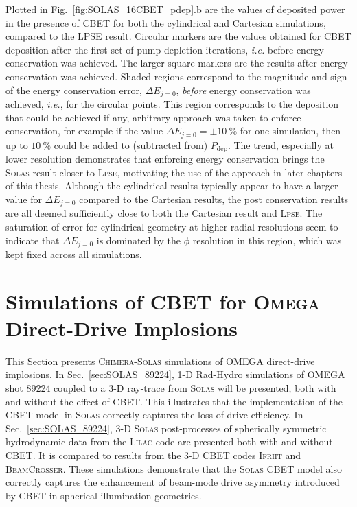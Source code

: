 Plotted in Fig.~\ref{fig:SOLAS_16CBET_pdep}.b are the values of deposited power in the presence of \ac{CBET} for both the cylindrical and Cartesian simulations, compared to the \textsc{LPSE} result.
Circular markers are the values obtained for \ac{CBET} deposition after the first set of pump-depletion iterations, \textit{i.e.} before energy conservation was achieved.
The larger square markers are the results after energy conservation was achieved.
Shaded regions correspond to the magnitude and sign of the energy conservation error, $\Delta E_{j=0}$, \textit{before} energy conservation was achieved, \textit{i.e.}, for the circular points.
This region corresponds to the deposition that could be achieved if any, arbitrary approach was taken to enforce conservation, for example if the value $\Delta E_{j=0}=\pm10\ \%$ for one simulation, then up to $10\ \%$ could be added to (subtracted from) $P_{\text{dep}}$.
The trend, especially at lower resolution demonstrates that enforcing energy conservation brings the \textsc{Solas} result closer to \textsc{Lpse}, motivating the use of the approach in later chapters of this thesis.
Although the cylindrical results typically appear to have a larger value for $\Delta E_{j=0}$ compared to the Cartesian results, the post conservation results are all deemed sufficiently close to both the Cartesian result and \textsc{Lpse}.
The saturation of error for cylindrical geometry at higher radial resolutions seem to indicate that $\Delta E_{j=0}$ is dominated by the $\phi$ resolution in this region, which  was kept fixed across all simulations.

\section{Simulations of CBET for \textsc{Omega} Direct-Drive Implosions}

This Section presents \textsc{Chimera}-\textsc{Solas} simulations of OMEGA direct-drive implosions.
In Sec.~\ref{sec:SOLAS_89224}, 1-D \ac{Rad-Hydro} simulations of OMEGA shot 89224 coupled to a 3-D ray-trace from \textsc{Solas} will be presented, both with and without the effect of \ac{CBET}.
This illustrates that the implementation of the \ac{CBET} model in \textsc{Solas} correctly captures the loss of drive efficiency.
In Sec.~\ref{sec:SOLAS_89224}, 3-D \textsc{Solas} post-processes of spherically symmetric hydrodynamic data from the \textsc{Lilac} code are presented both with and without \ac{CBET}.
It is compared to results from the 3-D \ac{CBET} codes \textsc{Ifriit} and \textsc{BeamCrosser}.
These simulations demonstrate that the \textsc{Solas} \ac{CBET} model also correctly captures the enhancement of beam-mode drive asymmetry introduced by \ac{CBET} in spherical illumination geometries.

